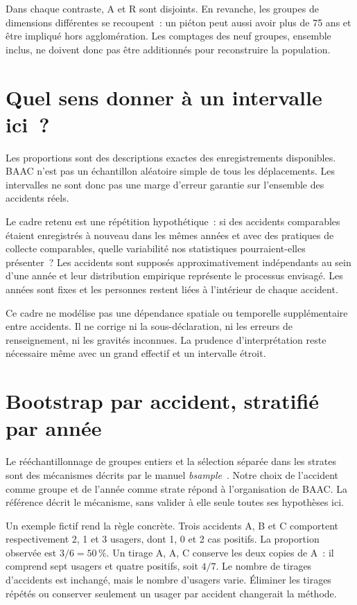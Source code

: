 Dans chaque contraste, A et R sont disjoints. En revanche, les groupes de dimensions
différentes se recoupent~: un piéton peut aussi avoir plus de 75 ans et être impliqué
hors agglomération. Les comptages des neuf groupes, ensemble inclus, ne doivent donc
pas être additionnés pour reconstruire la population.

\section{Quel sens donner à un intervalle ici~?}
Les proportions sont des descriptions exactes des enregistrements disponibles. BAAC
n'est pas un échantillon aléatoire simple de tous les déplacements. Les intervalles
ne sont donc pas une marge d'erreur garantie sur l'ensemble des accidents réels.

Le cadre retenu est une répétition hypothétique~: si des accidents comparables étaient
enregistrés à nouveau dans les mêmes années et avec des pratiques de collecte
comparables, quelle variabilité nos statistiques pourraient-elles présenter~? Les
accidents sont supposés approximativement indépendants au sein d'une année et leur
distribution empirique représente le processus envisagé. Les années sont fixes et
les personnes restent liées à l'intérieur de chaque accident.

Ce cadre ne modélise pas une dépendance spatiale ou temporelle supplémentaire entre
accidents. Il ne corrige ni la sous-déclaration, ni les erreurs de renseignement, ni
les gravités inconnues. La prudence d'interprétation reste nécessaire même avec un
grand effectif et un intervalle étroit.

\section{Bootstrap par accident, stratifié par année}
Le rééchantillonnage de groupes entiers et la sélection séparée dans les strates sont
des mécanismes décrits par le manuel \textit{bsample}~\cite{stata-bsample}. Notre choix
de l'accident comme groupe et de l'année comme strate répond à l'organisation de BAAC.
La référence décrit le mécanisme, sans valider à elle seule toutes ses hypothèses ici.

Un exemple fictif rend la règle concrète. Trois accidents A, B et C comportent
respectivement 2, 1 et 3 usagers, dont 1, 0 et 2 cas positifs. La proportion observée
est $3/6=50\,\%$. Un tirage A, A, C conserve les deux copies de A~: il comprend sept
usagers et quatre positifs, soit $4/7$. Le nombre de tirages d'accidents est inchangé,
mais le nombre d'usagers varie. Éliminer les tirages répétés ou conserver seulement
un usager par accident changerait la méthode.

